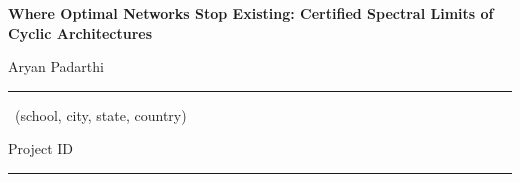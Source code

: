 \documentclass[landscape,letterpaper]{article}
\begin{document}
\fontsize{18}{21.5}\selectfont

\begin{minipage}[t]{0.80\textwidth}
{\fontsize{20}{23}\selectfont\bfseries\color{ink}
Where Optimal Networks Stop Existing: Certified Spectral Limits of Cyclic Architectures\par}
\vspace{2pt}
{\fontsize{18}{21}\selectfont Aryan Padarthi \quad\textbar\quad
\rule{2.6in}{0.5pt} \ (school, city, state, country)\par}
\end{minipage}%
\hfill
\begin{minipage}[t]{0.19\textwidth}\raggedleft
{\fontsize{18}{21}\selectfont Project ID\\[2pt]\rule{1.5in}{0.5pt}\par}
\end{minipage}

\vspace{3pt}
\end{document}
